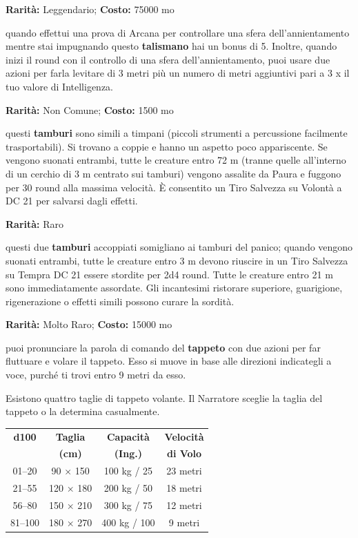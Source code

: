 \begin{multicols}{2}

\textbf{Rarità:} Leggendario; \textbf{Costo:} 75000 mo

quando effettui una prova di Arcana per controllare una sfera dell'annientamento mentre stai impugnando questo \textbf{talismano} hai un bonus di 5. Inoltre, quando inizi il round con il controllo di una sfera dell'annientamento, puoi usare due azioni per farla levitare di 3 metri più un numero di metri aggiuntivi pari a 3 x il tuo valore di Intelligenza.


\textbf{Rarità:} Non Comune; \textbf{Costo:} 1500 mo

questi \textbf{tamburi} sono simili a timpani (piccoli strumenti a percussione facilmente trasportabili). Si trovano a coppie e hanno un aspetto poco appariscente. Se vengono suonati entrambi, tutte le creature entro 72 m (tranne quelle all'interno di un cerchio di 3 m centrato sui tamburi) vengono assalite da Paura e fuggono per 30 round alla massima velocità. È consentito un Tiro Salvezza su Volontà a DC 21 per salvarsi dagli effetti.


\textbf{Rarità:} Raro

questi due \textbf{tamburi} accoppiati somigliano ai tamburi del panico; quando vengono suonati entrambi, tutte le creature entro 3 m devono riuscire in un Tiro Salvezza su Tempra DC 21 essere stordite per 2d4 round. Tutte le creature entro 21 m sono immediatamente assordate. Gli incantesimi ristorare superiore, guarigione, rigenerazione o effetti simili possono curare la sordità.


\textbf{Rarità:} Molto Raro; \textbf{Costo:} 15000 mo

puoi pronunciare la parola di comando del \textbf{tappeto} con due azioni per far fluttuare e volare il tappeto. Esso si muove in base alle direzioni indicategli a voce, purché ti trovi entro 9 metri da esso.

Esistono quattro taglie di tappeto volante. Il Narratore sceglie la taglia del tappeto o la determina casualmente.

\medskip

\noindent\begin{tabular}{cccc}
	\toprule
\textbf{d100} & \multicolumn{1}{c}{\textbf{Taglia}} & \textbf{Capacità} & \multicolumn{1}{c}{\textbf{Velocità}} \\
& \multicolumn{1}{c}{\textbf{(cm)}} &\textbf{(Ing.)} & \multicolumn{1}{c}{\textbf{di Volo}} \\
\toprule
\rowcolor{gray!20}01--20 & 90 × 150 & 100 kg / 25 & 23 metri \\
21--55 & 120 × 180 & 200 kg / 50 & 18 metri \\
\rowcolor{gray!20}56--80 & 150 × 210 & 300 kg / 75 & 12 metri \\
81--100 & 180 × 270 & 400 kg / 100 & 9 metri \\
\end{tabular}


\end{multicols}
